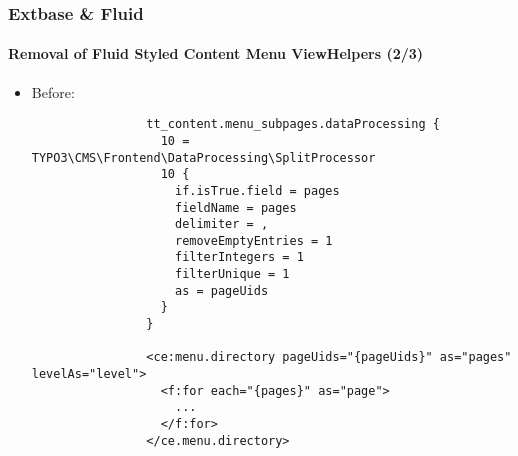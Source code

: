 
\begin{frame}[fragile]
	\frametitle{Extbase \& Fluid}
	\framesubtitle{Removal of Fluid Styled Content Menu ViewHelpers (2/3)}

	\lstset{basicstyle=\tiny\ttfamily}

	\begin{itemize}

		\item Before:

			\begin{lstlisting}
				tt_content.menu_subpages.dataProcessing {
				  10 = TYPO3\CMS\Frontend\DataProcessing\SplitProcessor
				  10 {
				    if.isTrue.field = pages
				    fieldName = pages
				    delimiter = ,
				    removeEmptyEntries = 1
				    filterIntegers = 1
				    filterUnique = 1
				    as = pageUids
				  }
				}

				<ce:menu.directory pageUids="{pageUids}" as="pages" levelAs="level">
				  <f:for each="{pages}" as="page">
				    ...
				  </f:for>
				</ce.menu.directory>
			\end{lstlisting}

	\end{itemize}

\end{frame}


